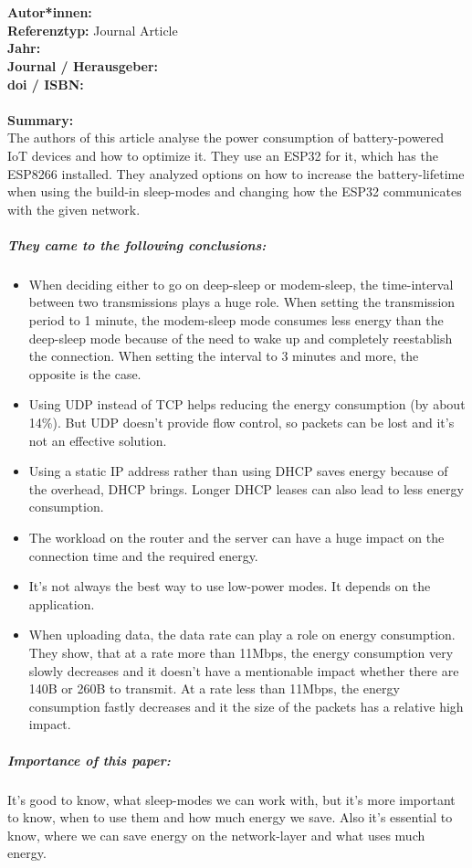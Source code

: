 \documentclass{report}
\newcommand{\createJournalArticleHeader}[1]{
    {\let\clearpage\relax \chapter{\citetitle{#1}}}
    \noindent
    \textbf{Autor*innen:} \citeauthor{#1} \\
    \textbf{Referenztyp:} Journal Article\\
    \textbf{Jahr:} \citeyear{#1} \\
    \textbf{Journal / Herausgeber:} \citefield{#1}{journaltitle}\\
    \textbf{doi / ISBN:} \citefield{#1}{doi} \\\\
    \textbf{Summary:}\\
}
\begin{document}
\createJournalArticleHeader{department_of_computer_engineering_mehmet_akif_ersoy_university_faculty_of_engineering_and_architecture_burdur_turkey_power_2020}
The authors of this article analyse the power consumption of battery-powered IoT devices and how to optimize it. They use an ESP32 for it, which has the ESP8266 installed. They analyzed options on how to increase the battery-lifetime when using the build-in sleep-modes and changing how the ESP32 communicates with the given network.\\
\paragraph{They came to the following conclusions:}
\begin{itemize}
    \item When deciding either to go on deep-sleep or modem-sleep, the time-interval between two transmissions plays a huge role. When setting the transmission period to 1 minute, the modem-sleep mode consumes less energy than the deep-sleep mode because of the need to wake up and completely reestablish the connection. When setting the interval to 3 minutes and more, the opposite is the case.
    \item Using UDP instead of TCP helps reducing the energy consumption (by about 14\%). But UDP doesn't provide flow control, so packets can be lost and it's not an effective solution.
    \item Using a static IP address rather than using DHCP saves energy because of the overhead, DHCP brings. Longer DHCP leases can also lead to less energy consumption.
    \item The workload on the router and the server can have a huge impact on the connection time and the required energy.  
    \item It's not always the best way to use low-power modes. It depends on the application. 
    \item When uploading data, the data rate can play a role on energy consumption. They show, that at a rate more than 11Mbps, the energy consumption very slowly decreases and it doesn't have a mentionable impact whether there are 140B or 260B to transmit. At a rate less than 11Mbps, the energy consumption fastly decreases and it the size of the packets has a relative high impact.
\end{itemize} 
\paragraph{Importance of this paper:}
It's good to know, what sleep-modes we can work with, but it's more important to know, when to use them and how much energy we save. Also it's essential to know, where we can save energy on the network-layer and what uses much energy.
\end{document}
